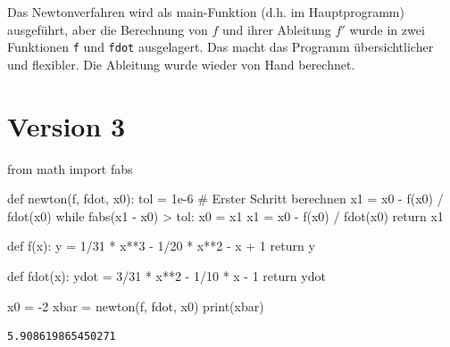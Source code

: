 \documentclass[
  a4paper,
  DIV=11]{scrreprt}
\newenvironment{Shaded}{\begin{snugshade}}{\end{snugshade}}
\newcommand{\BuiltInTok}[1]{\textcolor[rgb]{0.00,0.23,0.31}{#1}}
\newcommand{\CommentTok}[1]{\textcolor[rgb]{0.37,0.37,0.37}{#1}}
\newcommand{\ControlFlowTok}[1]{\textcolor[rgb]{0.00,0.23,0.31}{#1}}
\newcommand{\DecValTok}[1]{\textcolor[rgb]{0.68,0.00,0.00}{#1}}
\newcommand{\FloatTok}[1]{\textcolor[rgb]{0.68,0.00,0.00}{#1}}
\newcommand{\ImportTok}[1]{\textcolor[rgb]{0.00,0.46,0.62}{#1}}
\newcommand{\KeywordTok}[1]{\textcolor[rgb]{0.00,0.23,0.31}{#1}}
\newcommand{\NormalTok}[1]{\textcolor[rgb]{0.00,0.23,0.31}{#1}}
\newcommand{\OperatorTok}[1]{\textcolor[rgb]{0.37,0.37,0.37}{#1}}
\theoremstyle{definition}
\theoremstyle{definition}
\theoremstyle{remark}
\begin{document}
\begin{tcolorbox}
Das Newtonverfahren wird als main-Funktion (d.h. im Hauptprogramm)
ausgeführt, aber die Berechnung von \(f\) und ihrer Ableitung \(f'\)
wurde in zwei Funktionen \texttt{f} und \texttt{fdot} ausgelagert. Das
macht das Programm übersichtlicher und flexibler. Die Ableitung wurde
wieder von Hand berechnet.

\section{Version 3}

\begin{Shaded}
\begin{Highlighting}[]
\ImportTok{from}\NormalTok{ math }\ImportTok{import}\NormalTok{ fabs}

\KeywordTok{def}\NormalTok{ newton(f, fdot, x0):}
\NormalTok{    tol }\OperatorTok{=} \FloatTok{1e{-}6}
    \CommentTok{\# Erster Schritt berechnen}
\NormalTok{    x1 }\OperatorTok{=}\NormalTok{ x0 }\OperatorTok{{-}}\NormalTok{ f(x0) }\OperatorTok{/}\NormalTok{ fdot(x0)}
    \ControlFlowTok{while}\NormalTok{ fabs(x1 }\OperatorTok{{-}}\NormalTok{ x0) }\OperatorTok{\textgreater{}}\NormalTok{ tol:}
\NormalTok{        x0 }\OperatorTok{=}\NormalTok{ x1}
\NormalTok{        x1 }\OperatorTok{=}\NormalTok{ x0 }\OperatorTok{{-}}\NormalTok{ f(x0) }\OperatorTok{/}\NormalTok{ fdot(x0)}
    \ControlFlowTok{return}\NormalTok{ x1}

\KeywordTok{def}\NormalTok{ f(x):}
\NormalTok{    y }\OperatorTok{=} \DecValTok{1}\OperatorTok{/}\DecValTok{31} \OperatorTok{*}\NormalTok{ x}\OperatorTok{**}\DecValTok{3} \OperatorTok{{-}} \DecValTok{1}\OperatorTok{/}\DecValTok{20} \OperatorTok{*}\NormalTok{ x}\OperatorTok{**}\DecValTok{2} \OperatorTok{{-}}\NormalTok{ x }\OperatorTok{+} \DecValTok{1}
    \ControlFlowTok{return}\NormalTok{ y}

\KeywordTok{def}\NormalTok{ fdot(x):}
\NormalTok{    ydot }\OperatorTok{=} \DecValTok{3}\OperatorTok{/}\DecValTok{31} \OperatorTok{*}\NormalTok{ x}\OperatorTok{**}\DecValTok{2} \OperatorTok{{-}} \DecValTok{1}\OperatorTok{/}\DecValTok{10} \OperatorTok{*}\NormalTok{ x }\OperatorTok{{-}} \DecValTok{1}
    \ControlFlowTok{return}\NormalTok{ ydot}

\NormalTok{x0 }\OperatorTok{=} \OperatorTok{{-}}\DecValTok{2}
\NormalTok{xbar }\OperatorTok{=}\NormalTok{ newton(f, fdot, x0)}
\BuiltInTok{print}\NormalTok{(xbar)}
\end{Highlighting}
\end{Shaded}

\begin{verbatim}
5.908619865450271
\end{verbatim}


\end{tcolorbox}
\end{document}
